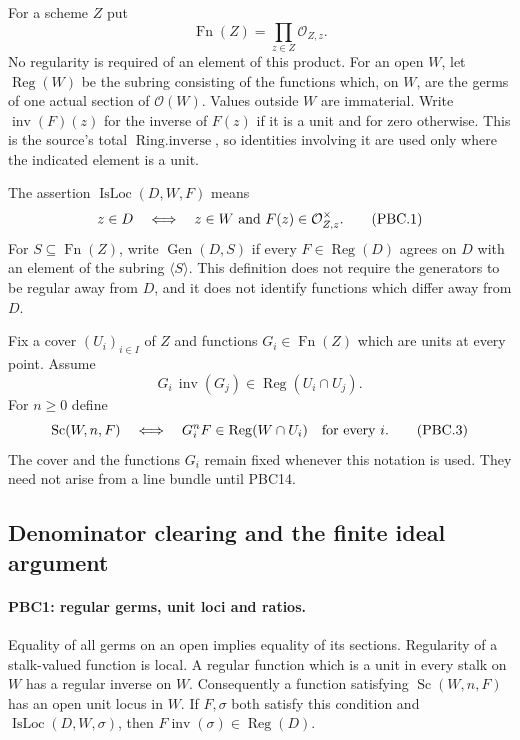 For a scheme $Z$ put
\[
 \operatorname{Fn}(Z)=\prod_{z\in Z}\mathcal O_{Z,z}.
\]
No regularity is required of an element of this product.  For an open
$W$, let $\operatorname{Reg}(W)$ be the subring consisting of the
functions which, on $W$, are the germs of one actual section of
$\mathcal O(W)$.  Values outside $W$ are immaterial.  Write
$\operatorname{inv}(F)(z)$ for the inverse of $F(z)$ if it is a unit
and for zero otherwise.  This is the source's total
$\operatorname{Ring.inverse}$, so identities involving it are used
only where the indicated element is a unit.

The assertion $\operatorname{IsLoc}(D,W,F)$ means
\[
 z\in D\quad\Longleftrightarrow\quad
 z\in W\ \hbox{and}\ F(z)\in\mathcal O_{Z,z}^{\times}.
                                                        \tag{PBC.1}
\]
For $S\subseteq\operatorname{Fn}(Z)$, write
$\operatorname{Gen}(D,S)$ if every $F\in\operatorname{Reg}(D)$
agrees on $D$ with an element of the subring $\langle S\rangle$.
This definition does not require the generators to be regular away
from $D$, and it does not identify functions which differ away from $D$.

Fix a cover $(U_i)_{i\in I}$ of $Z$ and functions
$G_i\in\operatorname{Fn}(Z)$ which are units at every point.  Assume
\[
 G_i\,\operatorname{inv}(G_j)\in
       \operatorname{Reg}(U_i\cap U_j).
                                                        \tag{PBC.2}
\]
For $n\ge0$ define
\[
 \operatorname{Sc}(W,n,F)
 \quad\Longleftrightarrow\quad
 G_i^nF\in\operatorname{Reg}(W\cap U_i)
       \quad\hbox{for every }i.
                                                        \tag{PBC.3}
\]
The cover and the functions $G_i$ remain fixed whenever this notation
is used.  They need not arise from a line bundle until PBC14.

\subsection{Denominator clearing and the finite ideal argument}

\paragraph{PBC1: regular germs, unit loci and ratios.}
\label{claim:PBC1}
Equality of all germs on an open implies equality of its sections.
Regularity of a stalk-valued function is local.  A regular function
which is a unit in every stalk on $W$ has a regular inverse on $W$.
Consequently a function satisfying $\operatorname{Sc}(W,n,F)$
has an open unit locus in $W$.  If $F,\sigma$ both satisfy this
condition and $\operatorname{IsLoc}(D,W,\sigma)$, then
$F\operatorname{inv}(\sigma)\in\operatorname{Reg}(D)$.

